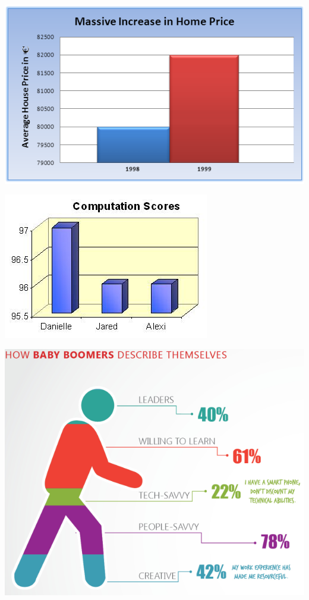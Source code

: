 \documentclass[
]{book}
\begin{document}
\includegraphics{img/vis11.png}

\includegraphics{img/vis12.jpg}

\includegraphics{img/vis12.png}
\end{document}
